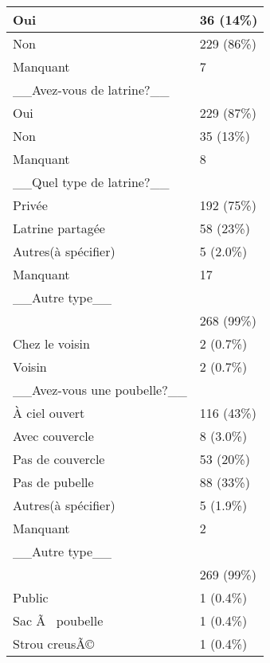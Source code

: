 \documentclass[
]{book}
\begin{document}
\begin{tabular}{l|l}
\hline
Oui & 36 (14\%)\\
\hline
Non & 229 (86\%)\\
\hline
Manquant & 7\\
\hline
\_\_Avez-vous de latrine?\_\_ & \\
\hline
Oui & 229 (87\%)\\
\hline
Non & 35 (13\%)\\
\hline
Manquant & 8\\
\hline
\_\_Quel type de latrine?\_\_ & \\
\hline
Privée & 192 (75\%)\\
\hline
Latrine partagée & 58 (23\%)\\
\hline
Autres(à spécifier) & 5 (2.0\%)\\
\hline
Manquant & 17\\
\hline
\_\_Autre type\_\_ & \\
\hline
 & 268 (99\%)\\
\hline
Chez le voisin & 2 (0.7\%)\\
\hline
Voisin & 2 (0.7\%)\\
\hline
\_\_Avez-vous une poubelle?\_\_ & \\
\hline
À ciel ouvert & 116 (43\%)\\
\hline
Avec couvercle & 8 (3.0\%)\\
\hline
Pas de couvercle & 53 (20\%)\\
\hline
Pas de pubelle & 88 (33\%)\\
\hline
Autres(à spécifier) & 5 (1.9\%)\\
\hline
Manquant & 2\\
\hline
\_\_Autre type\_\_ & \\
\hline
 & 269 (99\%)\\
\hline
Public & 1 (0.4\%)\\
\hline
Sac Ã  poubelle & 1 (0.4\%)\\
\hline
Strou creusÃ© & 1 (0.4\%)\\
\hline
\end{tabular}

  
\end{document}
